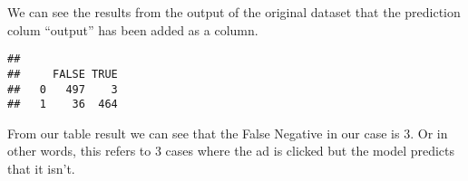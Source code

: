 \documentclass[
]{article}
\newenvironment{Shaded}{\begin{snugshade}}{\end{snugshade}}
\newcommand{\FloatTok}[1]{\textcolor[rgb]{0.00,0.00,0.81}{#1}}
\newcommand{\KeywordTok}[1]{\textcolor[rgb]{0.13,0.29,0.53}{\textbf{#1}}}
\newcommand{\NormalTok}[1]{#1}
\newcommand{\OperatorTok}[1]{\textcolor[rgb]{0.81,0.36,0.00}{\textbf{#1}}}
\newcommand{\StringTok}[1]{\textcolor[rgb]{0.31,0.60,0.02}{#1}}
\begin{document}
We can see the results from the output of the original dataset that the
prediction colum ``output'' has been added as a column.

\begin{Shaded}
\end{Shaded}

\begin{verbatim}
##    
##     FALSE TRUE
##   0   497    3
##   1    36  464
\end{verbatim}

From our table result we can see that the False Negative in our case is
3. Or in other words, this refers to 3 cases where the ad is clicked but
the model predicts that it isn't.
\end{document}
